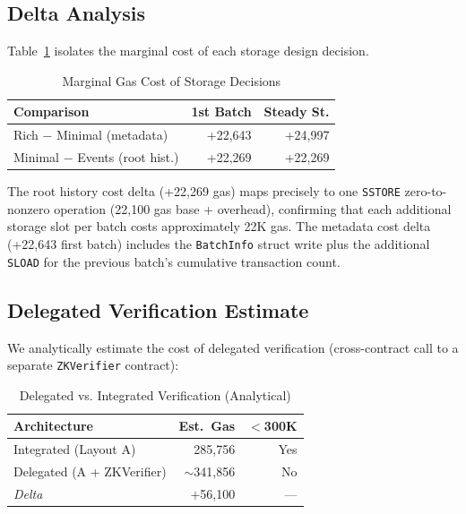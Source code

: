\subsection{Delta Analysis}

Table~\ref{tab:delta} isolates the marginal cost of each storage design decision.

\begin{table}[htbp]
\centering
\caption{Marginal Gas Cost of Storage Decisions}
\label{tab:delta}
\small
\begin{tabular}{@{}p{3.4cm}rr@{}}
\toprule
\textbf{Comparison} & \textbf{1st Batch} & \textbf{Steady St.} \\
\midrule
Rich $-$ Minimal (metadata)       & +22,643  & +24,997  \\
Minimal $-$ Events (root hist.)   & +22,269  & +22,269 \\
\bottomrule
\end{tabular}
\end{table}

The root history cost delta (+22,269 gas) maps precisely to one \texttt{SSTORE}
zero-to-nonzero operation (22,100 gas base + overhead), confirming that each additional
storage slot per batch costs approximately 22K gas. The metadata cost delta (+22,643 first
batch) includes the \texttt{BatchInfo} struct write plus the additional \texttt{SLOAD} for
the previous batch's cumulative transaction count.

\subsection{Delegated Verification Estimate}

We analytically estimate the cost of delegated verification (cross-contract call to a
separate \texttt{ZKVerifier} contract):

\begin{table}[htbp]
\centering
\caption{Delegated vs. Integrated Verification (Analytical)}
\label{tab:delegated}
\small
\begin{tabular}{@{}lrr@{}}
\toprule
\textbf{Architecture} & \textbf{Est.\ Gas} & \textbf{$<$300K} \\
\midrule
Integrated (Layout A)      & 285,756       & Yes \\
Delegated (A + ZKVerifier) & $\sim$341,856 & No \\
\midrule
\textit{Delta}             & +56,100       & --- \\
\bottomrule
\end{tabular}
\end{table}

